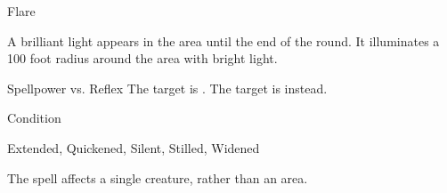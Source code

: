 \begin{spellsection}{Flare}
\begin{spellcontent}
\begin{spelltargetinginfo}
\end{spelltargetinginfo}
\begin{spelleffects}
\spelleffect
A brilliant light appears in the area until the end of the round.
It illuminates a 100 foot radius around the area with bright light.
\begin{spellattack}{Spellpower vs. Reflex}
\spellsuccess
The target is \dazzled.
\spellcritical
The target is \blinded instead.
\end{spellattack}
\spelldur Condition
\end{spelleffects}
\end{spellcontent}
\begin{spellfooter}
 Extended, Quickened, Silent, Stilled, Widened
\end{spellfooter}
\begin{spellsubcontent}
\begin{spellcantrip}
The spell affects a single creature, rather than an area.
\end{spellcantrip}
\end{spellsubcontent}
\end{spellsection}
